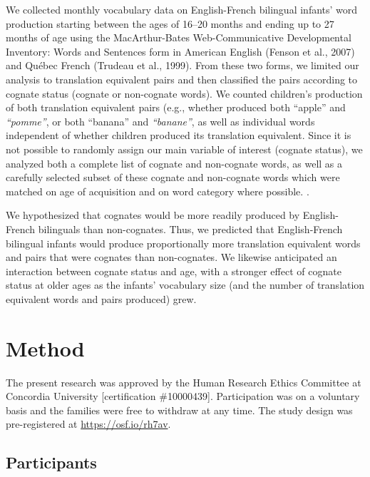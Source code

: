 \documentclass[
  english,
  ,man,floatsintext]{apa6}
\begin{document}
We collected monthly vocabulary data on English-French bilingual infants' word production starting between the ages of 16--20 months and ending up to 27 months of age using the MacArthur-Bates Web-Communicative Developmental Inventory: Words and Sentences form in American English (Fenson et al., 2007) and Québec French (Trudeau et al., 1999). From these two forms, we limited our analysis to translation equivalent pairs and then classified the pairs according to cognate status (cognate or non-cognate words). We counted children's production of both translation equivalent pairs (e.g., whether produced both ``apple'' and \emph{``pomme''}, or both ``banana'' and \emph{``banane''}, as well as individual words independent of whether children produced its translation equivalent. Since it is not possible to randomly assign our main variable of interest (cognate status), we analyzed both a complete list of cognate and non-cognate words, as well as a carefully selected subset of these cognate and non-cognate words which were matched on age of acquisition and on word category where possible. .

We hypothesized that cognates would be more readily produced by English-French bilinguals than non-cognates. Thus, we predicted that English-French bilingual infants would produce proportionally more translation equivalent words and pairs that were cognates than non-cognates. We likewise anticipated an interaction between cognate status and age, with a stronger effect of cognate status at older ages as the infants' vocabulary size (and the number of translation equivalent words and pairs produced) grew.

\hypertarget{method}{%
\section{Method}\label{method}}

The present research was approved by the Human Research Ethics Committee at Concordia University {[}certification \#10000439{]}. Participation was on a voluntary basis and the families were free to withdraw at any time. The study design was pre-registered at \url{https://osf.io/rh7av}.

\hypertarget{participants}{%
\subsection{Participants}\label{participants}}
\end{document}
